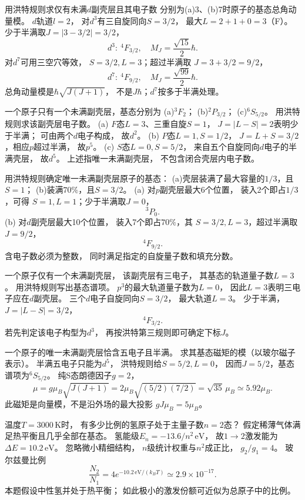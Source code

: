 用洪特规则求仅有未满$d$副壳层且其电子数
分别为(a)3、(b)7时原子的基态总角动量模。
\exsolution
$d$轨道$l=2$，
对$d^3$有三自旋同向$S=3/2$，
最大$L=2+1+0=3$（F）。
少于半满取$J=|3-3/2|=3/2$，
\[
 \boxed{d^3:\ {}^{4}F_{3/2},\quad
 M_J=\frac{\sqrt{15}}2\hbar}.
\]
对$d^7$可用三空穴等效，
$S=3/2,L=3$；超过半满取
$J=3+3/2=9/2$，
\[
 \boxed{d^7:\ {}^{4}F_{9/2},\quad
 M_J=\frac{\sqrt{99}}2\hbar}.
\]
\excheck 总角动量模是$\hbar\sqrt{J(J+1)}$，
不是$J\hbar$；$d^7$按多于半满处理。

一个原子只有一个未满副壳层，基态分别为
(a)\({}^{3}F_2\)；
(b)\({}^{2}P_{3/2}\)；
(c)\({}^{6}S_{5/2}\)。
用洪特规则求该副壳层电子数。
\exsolution
(a) $F$态$L=3$、三重自旋$S=1$，
$J=|L-S|=2$表明少于半满；
可由两个$d$电子构成，
故$\boxed{d^2}$。
(b) $P$态$L=1,S=1/2$，
$J=L+S=3/2$，相应$p$超过半满，
故$\boxed{p^5}$。
(c) $S$态$L=0,S=5/2$，
来自五个自旋同向$d$电子的半满壳层，
故$\boxed{d^5}$。
\excheck 上述指唯一未满副壳层，
不包含闭合壳层内电子数。

用洪特规则确定唯一未满副壳层原子的基态：
(a)壳层装满了最大容量的$1/3$，且$S=1$；
(b)装满$70\%$，且$S=3/2$。
\exsolution
(a) 对$p$副壳层最大6个位置，
装入2个即占$1/3$，可得
$S=1,L=1$；少于半满取$J=0$，
\[
 \boxed{{}^{3}P_0}.
\]
(b) 对$d$副壳层最大10个位置，
装入7个即占$70\%$，其
$S=3/2,L=3$，超过半满取$J=9/2$，
\[
 \boxed{{}^{4}F_{9/2}}.
\]
\excheck 含电子数必须为整数，
同时满足指定的自旋量子数和填充分数。

一个原子仅有一个未满副壳层，
该副壳层有三电子，
其基态的轨道量子数$L=3$。
用洪特规则写出基态谱项。
\exsolution
$p^3$的最大轨道量子数为$L=0$，
因此$L=3$表明三电子应在$d$副壳层。
三个$d$电子自旋同向$S=3/2$，
最大轨道$L=3$。
少于半满，$J=|L-S|=3/2$，
\[
 \boxed{{}^{4}F_{3/2}}.
\]
\excheck 若先判定该电子构型为$d^3$，
再按洪特第三规则即可确定下标$J$。

一个原子的唯一未满副壳层恰含五电子且半满。
求其基态磁矩的模（以玻尔磁子表示）。
\exsolution
半满五电子只能为$d^5$，
洪特规则给$S=5/2,L=0$，
因而$J=5/2$，基态谱项为\({}^{6}S_{5/2}\)。
纯S态朗德因子$g=2$，
\[
 \boxed{\mu=g\mu_B\sqrt{J(J+1)}
 =2\mu_B\sqrt{(5/2)(7/2)}
 =\sqrt{35}\,\mu_B\simeq5.92\mu_B}.
\]
\excheck 此磁矩是向量模，不是沿外场的最大投影
$gJ\mu_B=5\mu_B$。

温度$T=3000\,\mathrm K$时，
有多少比例的氢原子处于主量子数$n=2$态？
假定稀薄气体满足热平衡且几乎全部在基态。
\exsolution
氢能级$E_n=-13.6/n^2\,\mathrm{eV}$，
故$1\to2$激发能为$\Delta E=10.2\,\mathrm{eV}$。
忽略微小精细结构，
$n$级统计权重与$n^2$成正比，
$g_2/g_1=4$。
玻尔兹曼比例
\[
 \boxed{\frac{N_2}{N_1}=
 4e^{-10.2\,\mathrm{eV}/(k_BT)}
 \simeq2.9\times10^{-17}}.
\]
\excheck 本题假设中性氢并处于热平衡；
如此极小的激发份额可近似为总原子中的比例。

